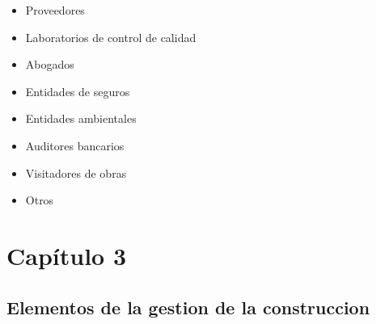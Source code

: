 \documentclass{article} %
\begin{document}
\begin{itemize}[label={},left=0pt,align=parleft]
\begin{itemize}[label={},left=1em,align=parleft]
        \item \begin{highlightbox}[leveltwo] Proveedores \end{highlightbox}
        \item \begin{highlightbox}[leveltwo] Laboratorios de control de calidad \end{highlightbox}
        \item \begin{highlightbox}[leveltwo] Abogados \end{highlightbox}
        \item \begin{highlightbox}[leveltwo] Entidades de seguros \end{highlightbox}
        \item \begin{highlightbox}[leveltwo] Entidades ambientales \end{highlightbox}
        \item \begin{highlightbox}[leveltwo] Auditores bancarios \end{highlightbox}
        \item \begin{highlightbox}[leveltwo] Visitadores de obras \end{highlightbox}
        \item \begin{highlightbox}[leveltwo] Otros \end{highlightbox}
    \end{itemize}
\end{itemize}

\newpage 

\section{Capítulo 3}
\subsection{Elementos de la gestion de la construccion}
\end{document}
